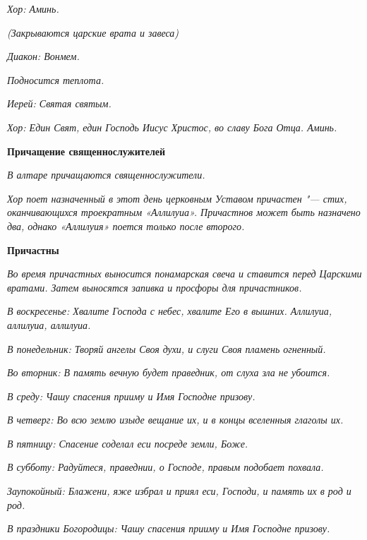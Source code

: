 \itshape Хор:\normalfont{} Аминь.


\itshape (Закрываются царские врата и завеса)\normalfont{}


\itshape Диакон:\normalfont{} Вонмем.


\itshape Подносится теплота.\normalfont{}


\itshape Иерей:\normalfont{} Святая святым.


\itshape Хор:\normalfont{} Един Свят, един Господь Иисус Христос, во славу Бога Отца. Аминь.





\bfseries  Причащение священнослужителей\normalfont{}


\itshape В алтаре причащаются священнослужители.\normalfont{}


\itshape Хор поет назначенный в этот день церковным Уставом причастен "--- стих, оканчивающихся троекратным «Аллилуиа». Причастнов может быть назначено два, однако «Аллилуия» поется только после второго.\normalfont{}





\bfseries  Причастны\normalfont{}


\itshape Во время причастных выносится понамарская свеча и ставится перед Царскими вратами. Затем выносятся запивка и просфоры для причастников.\normalfont{}


\itshape В воскресенье:\normalfont{} Хвалите Господа с небес, хвалите Его в вышних. Аллилуиа, аллилуиа, аллилуиа.


\itshape В понедельник:\normalfont{} Творяй ангелы Своя духи, и слуги Своя пламень огненный.


\itshape Во вторник:\normalfont{} В память вечную будет праведник, от слуха зла не убоится.


\itshape В среду:\normalfont{} Чашу спасения прииму и Имя Господне призову.


\itshape В четверг:\normalfont{} Во всю землю изыде вещание их, и в концы вселенныя глаголы их.


\itshape В пятницу:\normalfont{} Спасение соделал еси посреде земли, Боже.


\itshape В субботу:\normalfont{} Радуйтеся, праведнии, о Господе, правым подобает похвала.


\itshape Заупокойный:\normalfont{} Блажени, яже избрал и приял еси, Господи, и память их в род и род.


\itshape В праздники Богородицы:\normalfont{} Чашу спасения прииму и Имя Господне призову.


